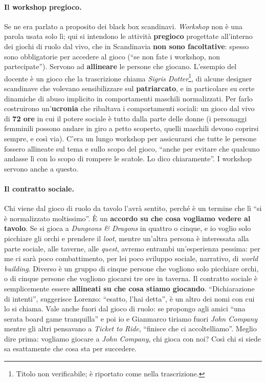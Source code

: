 \paragraph{Il workshop pregioco.} Se ne era parlato a proposito dei black box
scandinavi. \emph{Workshop} non è una parola usata solo lì; qui si intendono le
attività \textbf{pregioco} progettate all'interno dei giochi di ruolo dal vivo, che in
Scandinavia \textbf{non sono facoltative}: spesso sono obbligatorie per accedere al
gioco (``se non fate i workshop, non partecipate''). Servono ad \textbf{allineare} le
persone che giocano. L'esempio del docente è un gioco che la trascrizione chiama
\emph{Sigris Dotter}\footnote{Titolo non verificabile; è riportato come nella
trascrizione.}, di alcune designer scandinave che volevano sensibilizzare sul
\textbf{patriarcato}, e in particolare su certe dinamiche di abuso implicito in
comportamenti maschili normalizzati. Per farlo costruirono un'\textbf{ucronia} che
ribaltava i comportamenti sociali: un gioco dal vivo di \textbf{72 ore} in cui il
potere sociale è tutto dalla parte delle donne (i personaggi femminili possono andare
in giro a petto scoperto, quelli maschili devono coprirsi sempre, e così via). C'era
un lungo workshop per assicurarsi che tutte le persone fossero allineate sul tema e
sullo scopo del gioco, ``anche per evitare che qualcuno andasse lì con lo scopo di
rompere le scatole. Lo dico chiaramente''. I workshop servono anche a questo.

\paragraph{Il contratto sociale.} Chi viene dal gioco di ruolo da tavolo l'avrà
sentito, perché è un termine che lì ``si è normalizzato moltissimo''. È un
\textbf{accordo su che cosa vogliamo vedere al tavolo}. Se si gioca a \emph{Dungeons
\& Dragons} in quattro o cinque, e io voglio solo picchiare gli orchi e prendere il
\emph{loot}, mentre un'altra persona è interessata alla parte sociale, alle taverne,
alle \emph{quest}, avremo entrambi un'esperienza pessima: per me ci sarà poco
combattimento, per lei poco sviluppo sociale, narrativo, di \emph{world building}.
Diverso è un gruppo di cinque persone che vogliono solo picchiare orchi, o di cinque
persone che vogliono giocarsi tre ore in taverna. Il contratto sociale è semplicemente
essere \textbf{allineati su che cosa stiamo giocando}. ``Dichiarazione di intenti'',
suggerisce Lorenzo: ``esatto, l'hai detta'', è un altro dei nomi con cui lo si chiama.
Vale anche fuori dal gioco di ruolo: se propongo agli amici ``una serata board game
tranquilla'' e poi io e Gianmarco tiriamo fuori \emph{John Company} mentre gli altri
pensavano a \emph{Ticket to Ride}, ``finisce che ci accoltelliamo''. Meglio dire
prima: vogliamo giocare a \emph{John Company}, chi gioca con noi? Così chi si siede sa
esattamente che cosa sta per succedere.


